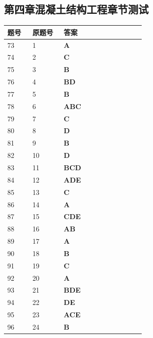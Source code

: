 \documentclass[UTF8,fontset=windows,11pt]{ctexart}
\begin{document}
\subsection*{第四章混凝土结构工程章节测试}
\begin{longtable}{p{0.16\linewidth}p{0.2\linewidth}p{0.52\linewidth}}
\textbf{\textcolor{examnavy}{题号}} & \textbf{\textcolor{examnavy}{原题号}} & \textbf{\textcolor{answergreen}{答案}} \\
\hline
73 & 1 & \textbf{\textcolor{answergreen}{A}} \\
74 & 2 & \textbf{\textcolor{answergreen}{C}} \\
75 & 3 & \textbf{\textcolor{answergreen}{B}} \\
76 & 4 & \textbf{\textcolor{answergreen}{BD}} \\
77 & 5 & \textbf{\textcolor{answergreen}{B}} \\
78 & 6 & \textbf{\textcolor{answergreen}{ABC}} \\
79 & 7 & \textbf{\textcolor{answergreen}{C}} \\
80 & 8 & \textbf{\textcolor{answergreen}{D}} \\
81 & 9 & \textbf{\textcolor{answergreen}{B}} \\
82 & 10 & \textbf{\textcolor{answergreen}{D}} \\
83 & 11 & \textbf{\textcolor{answergreen}{BCD}} \\
84 & 12 & \textbf{\textcolor{answergreen}{ADE}} \\
85 & 13 & \textbf{\textcolor{answergreen}{C}} \\
86 & 14 & \textbf{\textcolor{answergreen}{A}} \\
87 & 15 & \textbf{\textcolor{answergreen}{CDE}} \\
88 & 16 & \textbf{\textcolor{answergreen}{AB}} \\
89 & 17 & \textbf{\textcolor{answergreen}{A}} \\
90 & 18 & \textbf{\textcolor{answergreen}{B}} \\
91 & 19 & \textbf{\textcolor{answergreen}{C}} \\
92 & 20 & \textbf{\textcolor{answergreen}{A}} \\
93 & 21 & \textbf{\textcolor{answergreen}{BDE}} \\
94 & 22 & \textbf{\textcolor{answergreen}{DE}} \\
95 & 23 & \textbf{\textcolor{answergreen}{ACE}} \\
96 & 24 & \textbf{\textcolor{answergreen}{B}} \\

\end{longtable}
\end{document}

